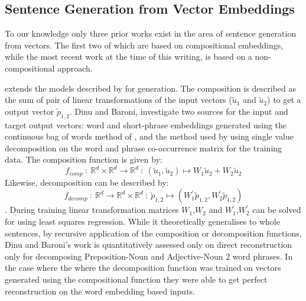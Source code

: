 \documentclass[11pt]{article}
\theoremstyle{plain}
\theoremstyle{definition}
\begin{document}
\subsection{Sentence Generation from Vector Embeddings}

To our knowledge only three prior works exist in the area of sentence generation from vectors. The first two of which are based on compositional embeddings, while the most recent work at the time of this writing, is based on a non-compositional approach.

\newcommand{\p}{\tilde{p}_{1,2}}
\renewcommand{\u}{\tilde{u}}


\textcite{Dinu2014CompositionalGeneration}  extends the models described by \textcite{zanzotto2010estimating, Guevara2010} for generation. The composition is described as the sum of pair of linear transformations of the input vectors ($\u_1$ and $\u_2$) to get a output vector $\p$. Dinu and Baroni, investigate two sources for the input and target output vectors: word and short-phrase embeddings generated using the continuous bag of words method of \cite{mikolov2013efficient}, and the method used by \textcite{Guevara2010} using single value decomposition on the word and phrase co-occurrence matrix for the training data. The composition function is given by:  $$f_{comp}\::\:\mathbb{R}^d\times\mathbb{R}^d \to \mathbb{R}^d\::\: (\u_1, \u_2)\mapsto W_1\u_2+W_2\u_2$$
Likewise, decomposition can be described by: $$f_{decomp}\::\:\mathbb{R}^d\to \mathbb{R}^d\times\mathbb{R}^d \::\: \p \mapsto (W^\prime_1\p, W^\prime_2\p)$$.
During training linear transformation matrices $W_1$,$W_2$ and $W_1^\prime$,$W_2^\prime$ can be solved for using least squares regression.
While it theoretically generalises to whole sentences, by recursive application of the composition or decomposition functions, Dinu and Baroni's work is quantitatively assessed only on direct reconstruction only for decomposing Preposition-Noun and Adjective-Noun 2 word phrases. In the case where the  where the decomposition function was trained on vectors generated using the compositional function they were able to get perfect reconstruction on the word embedding based inputs.

\renewcommand{\p}{\tilde{p}}
\end{document}
